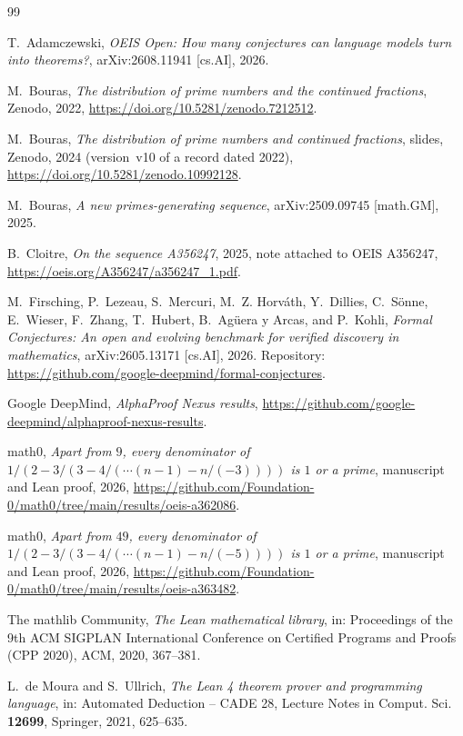 \documentclass[11pt]{amsart}
\theoremstyle{plain}
\theoremstyle{definition}
\begin{document}
\begin{thebibliography}{99}

T.~Adamczewski, \emph{OEIS Open: How many conjectures can language models turn into theorems?}, arXiv:2608.11941 [cs.AI], 2026.

M.~Bouras, \emph{The distribution of prime numbers and the continued fractions}, Zenodo, 2022, \url{https://doi.org/10.5281/zenodo.7212512}.

M.~Bouras, \emph{The distribution of prime numbers and continued fractions}, slides, Zenodo, 2024 (version~v10 of a record dated 2022), \url{https://doi.org/10.5281/zenodo.10992128}.

M.~Bouras, \emph{A new primes-generating sequence}, arXiv:2509.09745 [math.GM], 2025.

B.~Cloitre, \emph{On the sequence A356247}, 2025, note attached to OEIS A356247, \url{https://oeis.org/A356247/a356247_1.pdf}.

M.~Firsching, P.~Lezeau, S.~Mercuri, M.~Z. Horv\'ath, Y.~Dillies, C.~S\"onne, E.~Wieser, F.~Zhang, T.~Hubert, B.~Ag\"uera y Arcas, and P.~Kohli, \emph{Formal Conjectures: An open and evolving benchmark for verified discovery in mathematics}, arXiv:2605.13171 [cs.AI], 2026. Repository: \url{https://github.com/google-deepmind/formal-conjectures}.

Google DeepMind, \emph{AlphaProof Nexus results}, \url{https://github.com/google-deepmind/alphaproof-nexus-results}.

math0, \emph{Apart from $9$, every denominator of $1/(2-3/(3-4/(\cdots(n-1)-n/(-3))))$ is $1$ or a prime}, manuscript and Lean proof, 2026, \url{https://github.com/Foundation-0/math0/tree/main/results/oeis-a362086}.

math0, \emph{Apart from $49$, every denominator of $1/(2-3/(3-4/(\cdots(n-1)-n/(-5))))$ is $1$ or a prime}, manuscript and Lean proof, 2026, \url{https://github.com/Foundation-0/math0/tree/main/results/oeis-a363482}.

The mathlib Community, \emph{The Lean mathematical library}, in: Proceedings of the 9th ACM SIGPLAN International Conference on Certified Programs and Proofs (CPP 2020), ACM, 2020, 367--381.

L.~de Moura and S.~Ullrich, \emph{The Lean 4 theorem prover and programming language}, in: Automated Deduction -- CADE 28, Lecture Notes in Comput. Sci. \textbf{12699}, Springer, 2021, 625--635.


\end{thebibliography}
\end{document}
